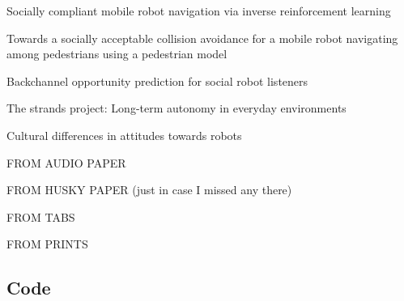\documentclass{sfuthesis}
\begin{document}
Socially compliant mobile robot navigation via inverse reinforcement learning

Towards a socially acceptable collision avoidance for a mobile robot navigating among pedestrians using a pedestrian model

Backchannel opportunity prediction for social robot listeners

The strands project: Long-term autonomy in everyday environments

Cultural differences in attitudes towards robots


FROM AUDIO PAPER



FROM HUSKY PAPER (just in case I missed any there)



FROM TABS



FROM PRINTS



%
%
%
%
%

\backmatter%
	
	

\begin{appendices} %
	\chapter{Code}
\end{appendices}
\end{document}
